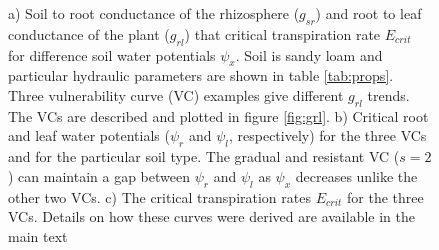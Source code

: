 \documentclass[utf8]{frontiersSCNS} %
\begin{document}
\begin{figure}[h]
    \caption{a) Soil to root conductance of the rhizosphere ($g_{sr}$) and root to leaf conductance of the plant ($g_{rl}$) that critical transpiration rate $E_{crit}$ for difference soil water potentials $\psi_x$. Soil is sandy loam and particular hydraulic parameters are shown in table \ref{tab:props}. Three vulnerability curve (VC) examples give different $g_{rl}$ trends. The VCs are described and plotted in figure \ref{fig:grl}. b) Critical root and leaf water potentials ($\psi_r$ and $\psi_l$, respectively) for the three VCs and for the particular soil type. The gradual and resistant VC ($s=2$) can maintain a gap between $\psi_r$ and $\psi_l$ as $\psi_x$ decreases unlike the other two VCs. c) The critical transpiration rates $E_{crit}$ for the three VCs. Details on how these curves were derived are available in the main text}
    \label{fig:gmax_Emax_psix}
\end{figure}
\end{document}
